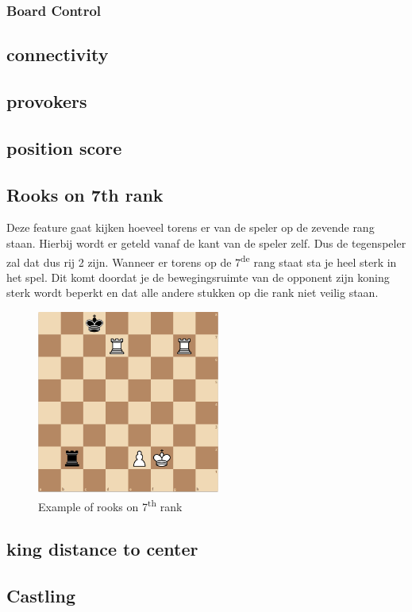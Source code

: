 \documentclass[a4paper,openany]{uantwerpenassignment}
\newcommand{\ts}{\textsuperscript}
\begin{document}
\subsubsection{Board Control}

\subsection{connectivity}
\subsection{provokers}
\subsection{position score}
\subsection{Rooks on 7th rank}
Deze feature gaat kijken hoeveel torens er van de speler op de zevende rang staan. Hierbij wordt er geteld vanaf de kant van de speler zelf. Dus de tegenspeler zal dat dus rij 2 zijn. Wanneer er torens op de 7\ts{de} rang staat sta je heel sterk in het spel. Dit komt doordat je de bewegingsruimte van de opponent zijn koning sterk wordt beperkt en dat alle andere stukken op die rank niet veilig staan.

\begin{figure}[h]
    \centering
    \includegraphics[width=170pt]{images/rooks7rank.png}
    \caption{Example of rooks on 7\ts{th} rank}
    \label{fig:rooks7rank}
\end{figure}


\subsection{king distance to center}
\subsection{Castling}
\end{document}
